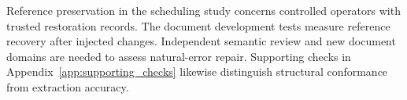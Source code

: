 Reference preservation in the scheduling study concerns controlled operators
with trusted restoration records. The document development tests measure
reference recovery after injected changes. Independent semantic review and
new document domains are needed to assess natural-error repair. Supporting
checks in Appendix~\ref{app:supporting_checks} likewise distinguish structural
conformance from extraction accuracy.
